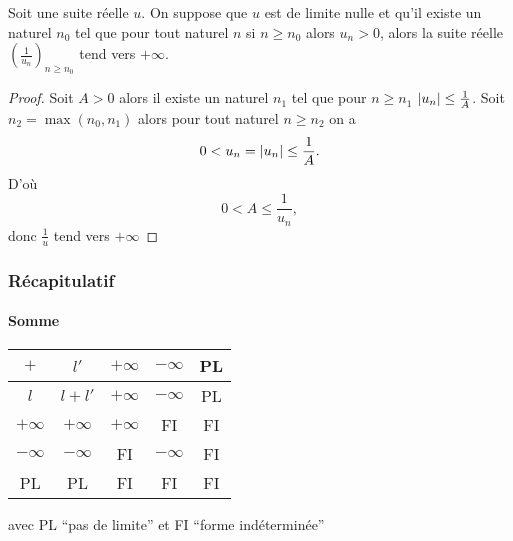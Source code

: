 \begin{prop}
  Soit une suite réelle $u$. On suppose que $u$ est de limite nulle et qu'il existe un naturel $n_0$ tel que pour tout naturel $n$ si $n \geq n_0$ alors $u_n > 0$, alors la suite réelle $\left(\frac{1}{u_n}\right)_{n \geq n_0}$ tend vers $+\infty$.
\end{prop}
\begin{proof}
  Soit $A>0$ alors il existe un naturel $n_1$ tel que pour $n \geq n_1$ $\left\lvert u_n\right\rvert \leq \frac{1}{A}$. Soit $n_2=\max(n_0,n_1)$ alors pour tout naturel $n \geq n_2$ on a
  \begin{equation}
    0 < u_n=\left\lvert u_n\right\rvert \leq \frac{1}{A}.
  \end{equation}
  D'où
  \begin{equation}
    0 < A \leq \frac{1}{u_n},
  \end{equation}
  donc $\frac{1}{u}$ tend vers $+\infty$
\end{proof}

\subsubsection{Récapitulatif}

\paragraph{Somme}

\begin{center}
  \begin{tabular}{|c|c|c|c|c|}\hline
    $+$ & $l'$ & $+\infty$ & $-\infty$ & PL \\ \hline
    $l$ & $l+l'$ & $+\infty$ & $-\infty$ & PL \\ \hline
    $+\infty$ & $+\infty$ & $+\infty$ & FI & FI \\ \hline
    $-\infty$ & $-\infty$ & FI & $-\infty$ & FI \\ \hline
    PL & PL & FI & FI & FI \\ \hline
  \end{tabular}
\end{center}

avec PL ``pas de limite'' et FI ``forme indéterminée''

